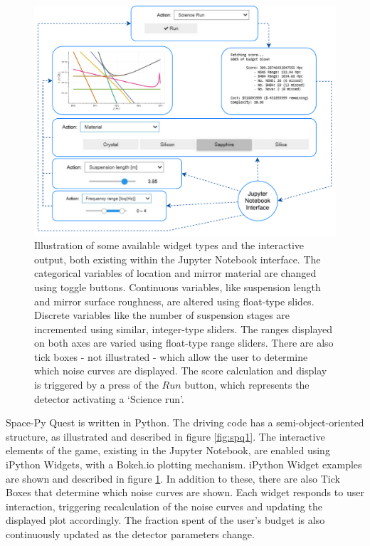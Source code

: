 \documentclass{article}
\begin{document}
\begin{figure}[h!]
    \centering
    \includegraphics[scale=0.75]{close-up.pdf}
    \caption{Illustration of some available widget types and the interactive output, both existing within the Jupyter Notebook interface. The categorical variables of location and mirror material are changed using toggle buttons. Continuous variables, like suspension length and mirror surface roughness, are altered using float-type slides. Discrete variables like the number of suspension stages are incremented using similar, integer-type sliders. The ranges displayed on both axes are varied using float-type range sliders. There are also tick boxes - not illustrated - which allow the user to determine which noise curves are displayed. The score calculation and display is triggered by a press of the $Run$ button, which represents the detector activating a `Science run'.}
    \label{fig:spq2}
\end{figure}
\clearpage
Space-Py Quest is written in Python. The driving code has a semi-object-oriented structure, as illustrated and described in figure \ref{fig:spq1}. The interactive elements of the game, existing in the Jupyter Notebook, are enabled using iPython Widgets, with a Bokeh.io plotting mechanism. iPython Widget examples are shown and described in figure \ref{fig:spq2}. In addition to these, there are also Tick Boxes that determine which noise curves are shown. Each widget responds to user interaction, triggering recalculation of the noise curves and updating the displayed plot accordingly. The fraction spent of the user's budget is also continuously updated as the detector parameters change.
\end{document}
